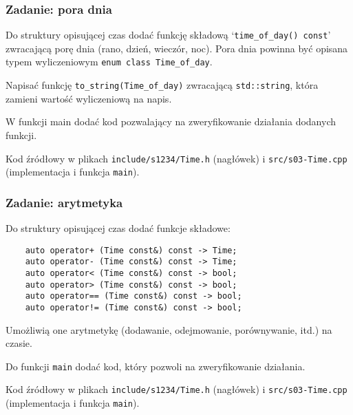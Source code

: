 \documentclass[aspectratio=169,10pt]{beamer}
\begin{document}
\begin{frame}
    \frametitle{Zadanie: pora dnia}
    \label{lecture_exercise_2}

    Do struktury opisującej czas dodać funkcję składową
    `{\tt time\_of\_day() const}' zwracającą porę dnia (rano, dzień, wieczór,
    noc). Pora dnia powinna być opisana typem wyliczeniowym {\tt enum class
    Time\_of\_day}.

    Napisać funkcję \texttt{to\_string(Time\_of\_day)} zwracającą
    \texttt{std::string}, która zamieni wartość wyliczeniową na napis.

    W funkcji main dodać kod pozwalający na zweryfikowanie działania dodanych
    funkcji.

    \vspace{1em}

    {\footnotesize
    Kod źródłowy w plikach {\tt include/s1234/Time.h} (nagłówek) i
    {\tt src/s03-Time.cpp} (implementacja i funkcja {\tt main}).}
\end{frame}

\begin{frame}[fragile]
    \frametitle{Zadanie: arytmetyka}
    \label{lecture_exercise_3}

    Do struktury opisującej czas dodać funkcje składowe:

    {\scriptsize
    \begin{lstlisting}
    auto operator+ (Time const&) const -> Time;
    auto operator- (Time const&) const -> Time;
    auto operator< (Time const&) const -> bool;
    auto operator> (Time const&) const -> bool;
    auto operator== (Time const&) const -> bool;
    auto operator!= (Time const&) const -> bool;
    \end{lstlisting}}

    Umożliwią one arytmetykę (dodawanie, odejmowanie, porównywanie, itd.) na czasie.

    Do funkcji \texttt{main} dodać kod, który pozwoli na zweryfikowanie
    działania.

    \vspace{1em}

    {\footnotesize
    Kod źródłowy w plikach {\tt include/s1234/Time.h} (nagłówek) i
    {\tt src/s03-Time.cpp} (implementacja i funkcja {\tt main}).}
\end{frame}
\end{document}
